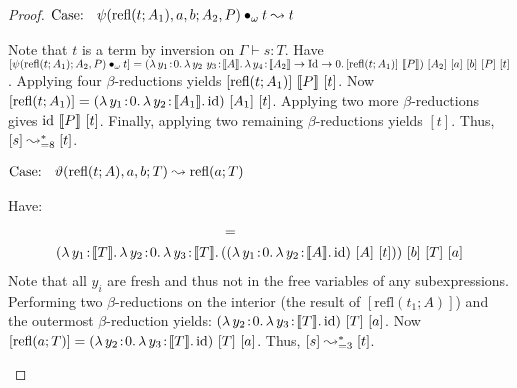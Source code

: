 \begin{proof}
    $\text{Case: }\begin{array}{c} \psi(\text{refl}(t; A_1), a, b; A_2, P) \bullet_{\omega} t \leadsto t \end{array}$
    \begin{proofcase}
        Note that $t$ is a term by inversion on $\Gamma \vdash s : T$.
        Have $[\app{\psi(\text{refl}(t; A_1); A_2, P)}{\omega}{t}] =
            (\abs{\lambda}{y_1}{0}{
                \abs{\lambda}{y_2\ y_3}{\sema{A}}{
                    \abs{\lambda}{y_4}{\sema{A_2} \to \fpId \to 0}{
                        [\text{refl}(t; A_1)]\ \sema{P}
                    }
                }
            })\ [A_2]\ [a]\ [b]\ [P]\ [t]$.
        Applying four $\beta$-reductions yields $[\text{refl}(t; A_1)]\ \sema{P}\ [t]$.
        Now $[\text{refl}(t; A_1)] =
            ({\lambda}\, y_1\! : \! 0.\, 
                {\lambda}\, y_2\! : \! \llbracket A_1 \rrbracket.\, \textnormal{id}
           )\ [A_1]\ [t]$.
        Applying two more $\beta$-reductions gives $\textnormal{id}\ \llbracket P \rrbracket\ [t]$.
        Finally, applying two remaining $\beta$-reductions yields $[t]$.
        Thus, $[s] \leadsto^*_{=8} [t]$.
    \end{proofcase}
    
    $\text{Case: }\begin{array}{c} \vartheta(\text{refl}(t; A), a, b; T) \leadsto \text{refl}(a; T) \end{array}$
    \begin{proofcase}
        Have:
        \begin{align*}
            [\vartheta(\text{refl}(t; A), a, b; T)] &= \\
            (\abs{\lambda}{y_1}{\sema{T}}{
                \abs{\lambda}{y_2}{0} {
                    \abs{\lambda}{y_3}{\sema{T}}{
                        &((\abs{\lambda}{y_1}{0}{
                            \abs{\lambda}{y_2}{\sema{A}}{\fpid}
                        })\ [A]\ [t])
                    }
                }
            })\ [b]\ [T]\ [a]
        \end{align*}
        Note that all $y_i$ are fresh and thus not in the free variables of any subexpressions.
        Performing two $\beta$-reductions on the interior (the result of $[\text{refl}(t_1;A)]$) and the outermost $\beta$-reduction yields:
            $(\abs{\lambda}{y_2}{0} {
                \abs{\lambda}{y_3}{\sema{T}}{
                    \fpid
                }
            })\ [T]\ [a]$.
        Now $[\text{refl}(a; T)] = (\abs{\lambda}{y_2}{0} {
                \abs{\lambda}{y_3}{\sema{T}}{
                    \fpid
                }
            })\ [T]\ [a]$.
        Thus, $[s] \leadsto^*_{=3} [t]$.
    \end{proofcase}
\end{proof}

